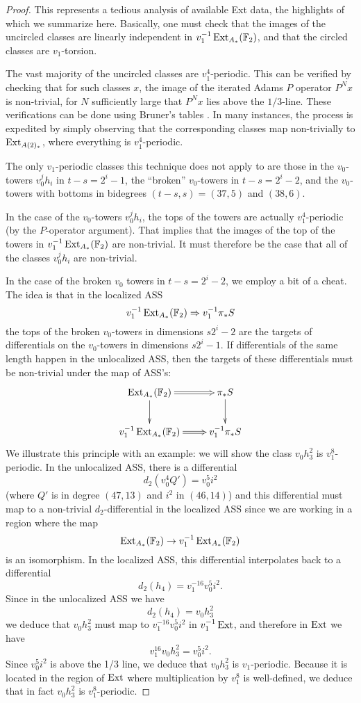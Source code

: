 \begin{proof}
This represents a tedious analysis of available Ext data, the highlights of which we summarize here.
Basically, one must check that the images of the uncircled classes are linearly independent in $v_1^{-1}\operatorname{Ext}_{A_*}(\mathbb{F}_2)$, and that the circled classes are $v_1$-torsion.

The vast majority of the uncircled classes are $v_1^4$-periodic.  This can be verified by checking that for such classes $x$, the image of the iterated Adams $P$ operator $P^N x$ is non-trivial, for $N$ sufficiently large that $P^N x$ lies above the $1/3$-line.  These verifications can be done using Bruner's tables \cite{Bruner}.  In many instances, the process is expedited by simply observing that the corresponding classes map non-trivially to $\operatorname{Ext}_{A(2)_*}$, where everything is $v_1^4$-periodic.


The only $v_1$-periodic classes this technique does not apply to are those in the $v_0$-towers $v_0^jh_i$ in $t-s = 2^i-1$, the ``broken'' $v_0$-towers in $t-s = 2^i-2$, and the $v_0$-towers with bottoms in bidegrees $(t-s,s) = (37, 5)$ and $(38,6)$.

In the case of the $v_0$-towers $v_0^jh_i$, the tops of the towers are actually $v_1^4$-periodic (by the $P$-operator argument).  That implies that the images of the top of the towers in $v_1^{-1}\operatorname{Ext}_{A_*}(\mathbb{F}_2)$ are non-trivial.  It must therefore be the case that all of the classes $v_0^jh_i$ are non-trivial.

In the case of the broken $v_0$ towers in $t-s = 2^i-2$, we employ a bit of a cheat.
The idea is that in the localized ASS
$$ v_1^{-1}\operatorname{Ext}_{A_*}(\mathbb{F}_2) \Rightarrow v_1^{-1}\pi_* S $$
the tops of the broken $v_0$-towers in dimensions $s2^i-2$ are the targets of differentials on the $v_0$-towers in dimensions $s2^i-1$.  If differentials of the same length happen in the unlocalized ASS, then the targets of these differentials must be non-trivial under the map of ASS's:
$$
\xymatrix{
\Ext_{A_*}(\FF_2) \ar[d] \ar@{=>}[r] &  \pi_* S \ar[d]
\\
v_1^{-1}\Ext_{A_*}(\FF_2) \ar@{=>}[r] &  v_1^{-1}\pi_* S
}
$$
We illustrate this principle with an example: we will show the class $v_0h_3^2$ is $v_1^8$-periodic.  In the unlocalized ASS, there is a differential
$$ d_2 (v_0^4 Q') = v_0^5 i^2 $$
(where $Q'$ is in degree $(47,13)$ and $i^2$ in $(46,14)$)
and this differential must map to a non-trivial $d_2$-differential in the localized ASS since we are working in a region where the map
$$ \operatorname{Ext}_{A_*}(\mathbb{F}_2) \rightarrow v_1^{-1}\operatorname{Ext}_{A_*}(\mathbb{F}_2) $$
is an isomorphism.  In the localized ASS, this differential interpolates back to a differential
$$ d_2 (h_4 ) = v_1^{-16} v_0^5 i^2. $$
Since in the unlocalized ASS we have
$$ d_2  (h_4)  = v_0 h_3^2 $$
we deduce that $v_0 h_3^2$ must map to $v_1^{-16} v_0^5 i^2$ in $v_1^{-1}\operatorname{Ext}$, and therefore in $\operatorname{Ext}$ we have
$$ v_1^{16} v_0 h_3^2 = v_0^5 i^2. $$
Since $v_0^5 i^2$ is above the 1/3 line, we deduce that $v_0 h_3^2$ is $v_1$-periodic.  Because it is located in the region of $\operatorname{Ext}$ where multiplication by $v_1^8$ is well-defined, we deduce that in fact $v_0h_3^2$ is $v_1^8$-periodic.


\end{proof}
